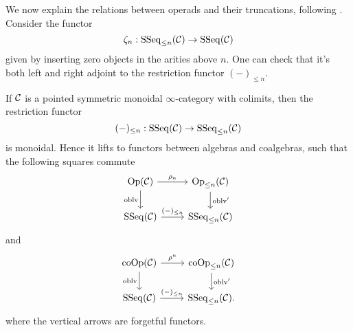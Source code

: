 We now explain the relations between operads and their truncations, following \cite{Heuts_Koszul}.
Consider the functor 
$$
\zeta_n: \operatorname{SSeq}_{\leq n}({\mathcal{C}}) \to \operatorname{SSeq}({\mathcal{C}})
$$
given by inserting zero objects in the arities above $n$. One can check that it's both left and right adjoint to the restriction functor
$
(-)_{\leq n}.
$

\begin{lemma}
	\cite[Lemma 2.16]{Hadrianphdthesis}
	If ${\mathcal{C}}$ is a pointed symmetric monoidal $\infty$-category with colimits,
	then the restriction functor
$$
(-)_{\leq n}: \operatorname{SSeq}({\mathcal{C}}) \to 
\operatorname{SSeq}_{\leq n}({\mathcal{C}})
$$
	is monoidal. Hence it lifts to functors between algebras and coalgebras,
	such that the following squares commute
\[
\begin{tikzcd}
	\Opd(\CC)  & 
	\operatorname{Op}_{\leq n}(\CC)\\
	\SSeq(\CC) & \SSeq_{\leq n}(\CC)
	\arrow[from=1-1, to= 1-2, "\rho_n"]
	\arrow[from=1-1, to=2-1, "\oblv" left]
	\arrow[from=1-2, to=2-2, "\oblv'" ]
	\arrow[from=2-1, to= 2-2, "(-)_{\leq n}"]
\end{tikzcd}
\]
and
\[
\begin{tikzcd}
	 \Coop(\CC)  & 
	\operatorname{coOp}_{\leq n}(\CC)\\
	\SSeq(\CC) & \SSeq_{\leq n}(\CC)
	\arrow[from=1-1, to= 1-2, "\rho^n"]
	\arrow[from=1-1, to=2-1, "\oblv" left]
	\arrow[from=1-2, to=2-2, "\oblv'" ]
	\arrow[from=2-1, to= 2-2, "(-)_{\leq n}"].
\end{tikzcd}
\]
where the vertical arrows are forgetful functors.
\end{lemma}

